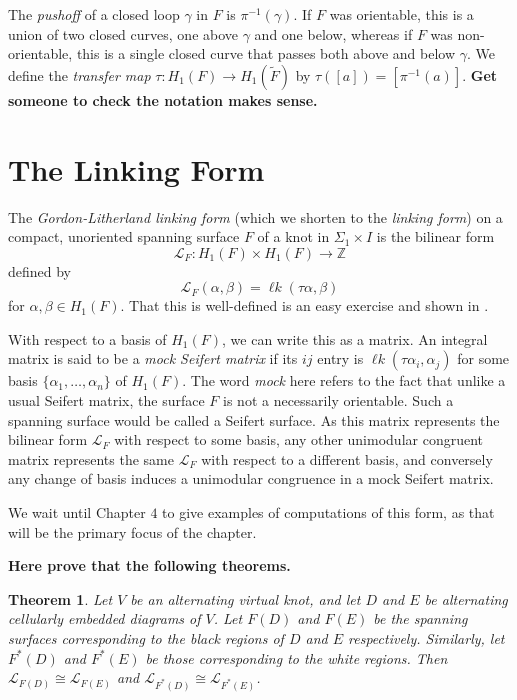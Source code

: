 \documentclass[12pt]{report}
\newcommand{\Z}{\mathbb{Z}}
\newcommand{\lk}{\operatorname{\ell\textit{k}}}
\newcommand{\notered}[1]{{\color{Red} \textbf{#1}}}
\newtheorem*{theorem}{Theorem}
\begin{document}
The \textit{pushoff} of a closed loop $\gamma$ in $F$ is $\pi^{-1}(\gamma)$. If $F$ was orientable, this is a union of two closed curves, one above $\gamma$ and one below, whereas if $F$ was non-orientable, this is a single closed curve that passes both above and below $\gamma$. We define the \textit{transfer map} $\tau: H_{1}(F) \longrightarrow H_{1}(\widetilde{F})$ by $\tau([a]) = [\pi^{-1}(a)]$. \notered{Get someone to check the notation makes sense.}

\section{The Linking Form}
The \textit{Gordon-Litherland linking form} (which we shorten to the \textit{linking form}) on a compact, unoriented spanning surface $F$ of a knot in $\Sigma_{1} \times I$ is the bilinear form
\[\mathcal{L}_{F}: H_{1}(F) \times H_{1}(F) \longrightarrow \Z\]
defined by
\[\mathcal{L}_{F}(\alpha, \beta) = \lk(\tau\alpha, \beta)\]
for $\alpha, \beta \in H_{1}(F)$. That this is well-defined is an easy exercise and shown in \cite[Chapter 2]{alternating-links-thickened-surfaces}. 

With respect to a basis of $H_{1}(F)$, we can write this as a matrix. An integral matrix is said to be a \textit{mock Seifert matrix} if its $ij$ entry is $\lk(\tau \alpha_{i}, \alpha_{j})$ for some basis $\{\alpha_{1}, \dots, \alpha_{n}\}$ of $H_{1}(F)$. The word \textit{mock} here refers to the fact that unlike a usual Seifert matrix, the surface $F$ is not a necessarily orientable. Such a spanning surface would be called a Seifert surface. As this matrix represents the bilinear form $\mathcal{L}_{F}$ with respect to some basis, any other unimodular congruent matrix represents the same $\mathcal{L}_{F}$ with respect to a different basis, and conversely any change of basis induces a unimodular congruence in a mock Seifert matrix.

We wait until Chapter $4$ to give examples of computations of this form, as that will be the primary focus of the chapter.

\notered{Here prove that the following theorems.}

\begin{theorem}
Let $V$ be an alternating virtual knot, and let $D$ and $E$ be alternating cellularly embedded diagrams of $V$. Let $F(D)$ and $F(E)$ be the spanning surfaces corresponding to the black regions of $D$ and $E$ respectively. Similarly, let $F^{*}(D)$ and $F^{*}(E)$ be those corresponding to the white regions. Then $\mathcal{L}_{F(D)} \cong \mathcal{L}_{F(E)}$ and $\mathcal{L}_{F^{*}(D)} \cong \mathcal{L}_{F^{*}(E)}$.
\end{theorem}
\end{document}
